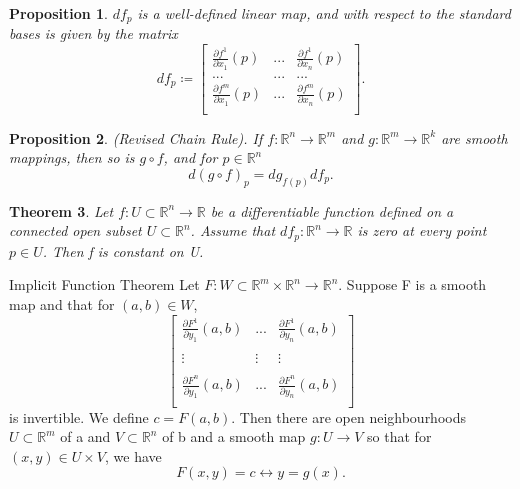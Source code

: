 \documentclass[twoside]{article}
\newcounter{lecnum}
\newtheorem{theorem}{Theorem}[lecnum]
\newtheorem{proposition}[theorem]{Proposition}
\begin{document}
\begin{proposition}$df_p$ is a well-defined linear map, and with respect to the standard bases is given by the matrix 
$$
df_p \coloneqq 
\begin{bmatrix}
\frac{\partial f^1}{\partial x_1}(p) & ... & \frac{\partial f^1}{\partial x_n}(p)\\
... & ... & ...\\
\frac{\partial f^m}{\partial x_1}(p) & ... & \frac{\partial f^m}{\partial x_n}(p)\\
\end{bmatrix}.
$$
\end{proposition}

\begin{proposition}(Revised Chain Rule). If $f: \mathbb{R}^n \rightarrow \mathbb{R}^m$ and $g: \mathbb{R}^m \rightarrow \mathbb{R}^k$ are smooth mappings, then so is $g \circ f$, and for $p \in \mathbb{R}^n$
$$
d(g \circ f)_p = dg_{f(p)}df_p.
$$
\end{proposition}

\begin{theorem}Let $f: U \subset \mathbb{R}^n \rightarrow \mathbb{R}$ be a differentiable function defined on a connected open subset $U \subset \mathbb{R}^n$. Assume that $df_p: \mathbb{R}^n \rightarrow \mathbb{R}$ is zero at every point $p \in U$. Then f is constant on U.
\end{theorem}

\begin{theorem_exam}{Implicit Function Theorem}{} Let $F: W \subset \mathbb{R}^{m} \times \mathbb{R}^n \rightarrow \mathbb{R}^n$. Suppose F is a smooth map and that for $(a, b) \in W$, 
$$
\begin{bmatrix}
\frac{\partial F^1}{\partial y_1}(a,b) & ... & \frac{\partial F^1}{\partial y_n}(a,b)\\
\\
\vdots & \vdots & \vdots\\\\
\frac{\partial F^n}{\partial y_1}(a,b) & ... & \frac{\partial F^n}{\partial y_n}(a,b)\\
\end{bmatrix}
$$
is invertible. We define $c = F(a,b)$. Then there are open neighbourhoods $U \subset \mathbb{R}^m$ of a and $V \subset \mathbb{R}^n$ of b and a smooth map $g: U \rightarrow V$ so that for $(x,y) \in U \times V$, we have 
$$
F(x,y) = c \leftrightarrow y = g(x).
$$
\end{theorem_exam}
\end{document}
